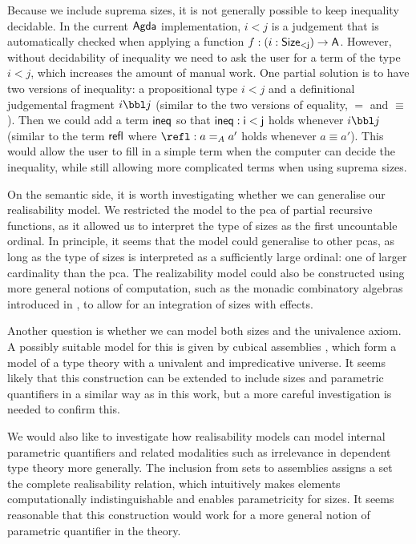 Because we include suprema sizes, it is not generally possible to keep inequality decidable.
In the current \(\sf{Agda}\) implementation, \(i<j\) is a judgement that is automatically checked when applying a function \(f : (i : \sf{Size}_{<j}) \to A\). However, without decidability of inequality we need to ask the user for a term of the type \(i<j\), which increases the amount of manual work.
One partial solution is to have two versions of inequality: a propositional type \(i<j\) and a definitional judgemental fragment \(i\bbl j\) (similar to the two versions of equality, \(=\) and \(\equiv\)).
Then we could add a term \(\sf{ineq}\) so that \(\sf{ineq}:i<j\) holds whenever \(i\bbl j\) (similar to the term \(\sf{refl}\) where \(\refl:a=_Aa'\) holds whenever \(a\equiv a'\)).
This would allow the user to fill in a simple term when the computer can decide the inequality, while still allowing more complicated terms when using suprema sizes.

On the semantic side, it is worth investigating whether we can generalise our realisability model.
We restricted the model to the pca of partial recursive functions, as it allowed us to interpret the type of sizes as the first uncountable ordinal.
In principle, it seems that the model could generalise to other pcas, as long as the type of sizes is interpreted as a sufficiently large ordinal: one of larger cardinality than the pca. The realizability model could also be constructed using more general notions of computation, such as the monadic combinatory algebras introduced in \cite{Cohen-et-al-2025}, to allow for an integration of sizes with effects.

Another question is whether we can model both sizes and the univalence axiom. A possibly suitable model for this is given by cubical assemblies \cite{cubical-assemblies}, which form a model of a type theory with a univalent and impredicative universe. 
It seems likely that this construction can be extended to include sizes and parametric quantifiers in a similar way as in this work, but a more careful investigation is needed to confirm this.

We would also like to investigate how realisability models can model internal parametric quantifiers and related modalities such as irrelevance in dependent type theory more generally.
The inclusion from sets to assemblies assigns a set the complete realisability relation, which intuitively makes elements computationally indistinguishable and enables parametricity for sizes.
It seems reasonable that this construction would work for a more general notion of parametric quantifier in the theory.

